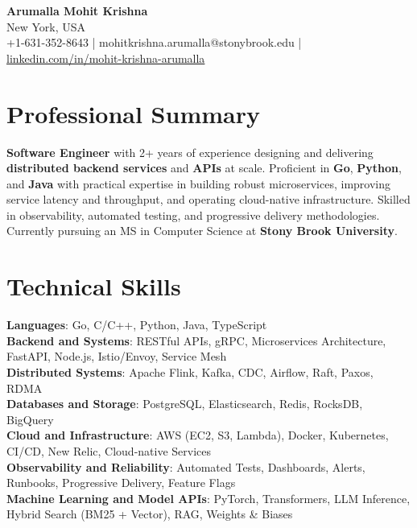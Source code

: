 \documentclass[letterpaper,11pt]{article}
\begin{document}
\begin{center}
  {\Large \textbf{Arumalla Mohit Krishna}} \\
  New York, USA \\
  +1-631-352-8643 \enspace | \enspace mohitkrishna.arumalla@stonybrook.edu \enspace | \enspace \href{https://www.linkedin.com/in/mohit-krishna-arumalla}{linkedin.com/in/mohit-krishna-arumalla}
\end{center}

\section{Professional Summary}
  \begin{itemize}[leftmargin=0.15in, label={}]
    \small{\item{
     \textbf{Software Engineer} with 2+ years of experience designing and delivering \textbf{distributed backend services} and \textbf{APIs} at scale. Proficient in \textbf{Go}, \textbf{Python}, and \textbf{Java} with practical expertise in building robust microservices, improving service latency and throughput, and operating cloud-native infrastructure. Skilled in observability, automated testing, and progressive delivery methodologies. Currently pursuing an MS in Computer Science at \textbf{Stony Brook University}.
    }}
  \end{itemize}
\vspace{-16pt}

\section{Technical Skills}
 \begin{itemize}[leftmargin=0.15in, label={}]
    \small{\item{
     \textbf{Languages}: Go, C/C++, Python, Java, TypeScript \\
     \textbf{Backend and Systems}: RESTful APIs, gRPC, Microservices Architecture, FastAPI, Node.js, Istio/Envoy, Service Mesh \\
     \textbf{Distributed Systems}: Apache Flink, Kafka, CDC, Airflow, Raft, Paxos, RDMA \\
     \textbf{Databases and Storage}: PostgreSQL, Elasticsearch, Redis, RocksDB, BigQuery \\
     \textbf{Cloud and Infrastructure}: AWS (EC2, S3, Lambda), Docker, Kubernetes, CI/CD, New Relic, Cloud-native Services \\
     \textbf{Observability and Reliability}: Automated Tests, Dashboards, Alerts, Runbooks, Progressive Delivery, Feature Flags \\
     \textbf{Machine Learning and Model APIs}: PyTorch, Transformers, LLM Inference, Hybrid Search (BM25 + Vector), RAG, Weights \& Biases
    }}
 \end{itemize}
\vspace{-16pt}
\end{document}
